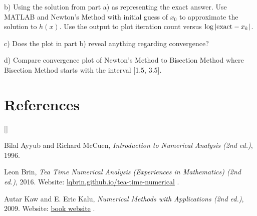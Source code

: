 \documentclass{article}
\def\beginrefs{\begin{list}%
        {[\arabic{equation}]}{\usecounter{equation}
         \setlength{\leftmargin}{2.0truecm}\setlength{\labelsep}{0.4truecm}%
         \setlength{\labelwidth}{1.6truecm}}}
\def\endrefs{\end{list}}
\def\bibentry#1{\item[\hbox{[#1]}]}
\begin{document}
b) Using the solution from part a) as representing the exact answer.  Use MATLAB and Newton's Method with initial guess of $x_0$ to approximate the solution to $h(x)$. Use the output to plot iteration count versus $\log \vert {\rm exact}-x_k \vert$. \smallskip \par

c) Does the plot in part b) reveal anything regarding convergence?  \smallskip \par


d) Compare convergence plot of Newton's Method to Bisection Method where Bisection Method starts with the interval [1.5, 3.5]. 

\section*{References}
\beginrefs

\bibentry{AM96}{\sc Bilal Ayyub} and {\sc Richard McCuen},
{\it Introduction to Numerical Analysis (2nd ed.)}, 1996. 

\bibentry{LB16}{\sc Leon Brin},
{\it Tea Time Numerical Analysis (Experiences in Mathematics)  (2nd ed.)}, 2016. Website: \href{http://lqbrin.github.io/tea-time-numerical/}{lqbrin.github.io/tea-time-numerical} .

\bibentry{KK09} {\sc Autar Kaw} and {\sc E. Eric Kalu}, {\it Numerical Methods with Applications (2nd ed.)}, 2009. Website: \href{http://autarkaw.com/books/numericalmethods/index.html}{book website} .

\endrefs
\end{document}
